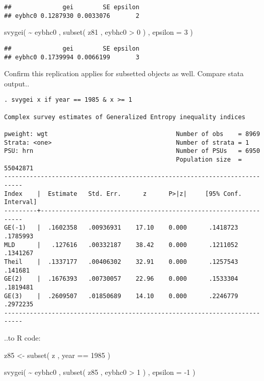 \documentclass[
]{book}
\newenvironment{Shaded}{\begin{snugshade}}{\end{snugshade}}
\newcommand{\AttributeTok}[1]{\textcolor[rgb]{0.77,0.63,0.00}{#1}}
\newcommand{\DecValTok}[1]{\textcolor[rgb]{0.00,0.00,0.81}{#1}}
\newcommand{\FunctionTok}[1]{\textcolor[rgb]{0.00,0.00,0.00}{#1}}
\newcommand{\NormalTok}[1]{#1}
\newcommand{\OtherTok}[1]{\textcolor[rgb]{0.56,0.35,0.01}{#1}}
\newcommand{\SpecialCharTok}[1]{\textcolor[rgb]{0.00,0.00,0.00}{#1}}
\begin{document}
\begin{verbatim}
##              gei        SE epsilon
## eybhc0 0.1287930 0.0033076       2
\end{verbatim}

\begin{Shaded}
\begin{Highlighting}[]
\FunctionTok{svygei}\NormalTok{( }\SpecialCharTok{\textasciitilde{}}\NormalTok{ eybhc0 , }\FunctionTok{subset}\NormalTok{( z81 , eybhc0 }\SpecialCharTok{\textgreater{}} \DecValTok{0}\NormalTok{ ) , }\AttributeTok{epsilon =} \DecValTok{3}\NormalTok{ )}
\end{Highlighting}
\end{Shaded}

\begin{verbatim}
##              gei        SE epsilon
## eybhc0 0.1739994 0.0066199       3
\end{verbatim}

Confirm this replication applies for subsetted objects as well. Compare stata output..

\begin{verbatim}
. svygei x if year == 1985 & x >= 1

Complex survey estimates of Generalized Entropy inequality indices
 
pweight: wgt                                   Number of obs    = 8969
Strata: <one>                                  Number of strata = 1
PSU: hrn                                       Number of PSUs   = 6950
                                               Population size  = 55042871
---------------------------------------------------------------------------
Index    |  Estimate   Std. Err.      z      P>|z|     [95% Conf. Interval]
---------+-----------------------------------------------------------------
GE(-1)   |  .1602358   .00936931    17.10    0.000      .1418723   .1785993
MLD      |   .127616   .00332187    38.42    0.000      .1211052   .1341267
Theil    |  .1337177   .00406302    32.91    0.000      .1257543    .141681
GE(2)    |  .1676393   .00730057    22.96    0.000      .1533304   .1819481
GE(3)    |  .2609507   .01850689    14.10    0.000      .2246779   .2972235
---------------------------------------------------------------------------
\end{verbatim}

..to R code:

\begin{Shaded}
\begin{Highlighting}[]
\NormalTok{z85 }\OtherTok{\textless{}{-}} \FunctionTok{subset}\NormalTok{( z , year }\SpecialCharTok{==} \DecValTok{1985}\NormalTok{ )}

\FunctionTok{svygei}\NormalTok{( }\SpecialCharTok{\textasciitilde{}}\NormalTok{ eybhc0 , }\FunctionTok{subset}\NormalTok{( z85 , eybhc0 }\SpecialCharTok{\textgreater{}} \DecValTok{1}\NormalTok{ ) , }\AttributeTok{epsilon =} \SpecialCharTok{{-}}\DecValTok{1}\NormalTok{ )}
\end{Highlighting}
\end{Shaded}
\end{document}

